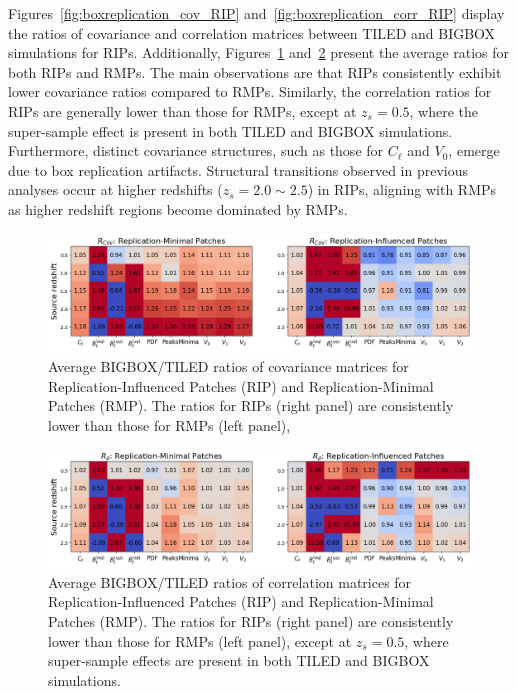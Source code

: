 Figures~\ref{fig:boxreplication_cov_RIP} and~\ref{fig:boxreplication_corr_RIP} display the ratios of covariance and correlation matrices between TILED and BIGBOX simulations for RIPs. Additionally, Figures~\ref{fig:boxreplication_avg_cov} and~\ref{fig:boxreplication_avg_corr} present the average ratios for both RIPs and RMPs. The main observations are that RIPs consistently exhibit lower covariance ratios compared to RMPs. Similarly, the correlation ratios for RIPs are generally lower than those for RMPs, except at $z_s=0.5$, where the super-sample effect is present in both TILED and BIGBOX simulations. Furthermore, distinct covariance structures, such as those for $C_\ell$ and $V_0$, emerge due to box replication artifacts. Structural transitions observed in previous analyses occur at higher redshifts ($z_s=2.0\sim2.5$) in RIPs, aligning with RMPs as higher redshift regions become dominated by RMPs.

\begin{figure}[ht]
    \centering
    \includegraphics[width=\textwidth]{figures/results/BR_avg_cov_ratio.png}
    \caption[Average BIGBOX / TILED ratios of covariance matrices for the RIPs and the RMPs]{Average BIGBOX/TILED ratios of covariance matrices for Replication-Influenced Patches (RIP) and Replication-Minimal Patches (RMP). The ratios for RIPs (right panel) are consistently lower than those for RMPs (left panel), }
    \label{fig:boxreplication_avg_cov}
\end{figure}

\begin{figure}[ht]
    \includegraphics[width=\textwidth]{figures/results/BR_avg_corr_ratio.png}
    \caption[Average BIGBOX / TILED ratios of correlation matrices for the RIPs and the RMPs]{Average BIGBOX/TILED ratios of correlation matrices for Replication-Influenced Patches (RIP) and Replication-Minimal Patches (RMP). The ratios for RIPs (right panel) are consistently lower than those for RMPs (left panel), except at $z_s = 0.5$, where super-sample effects are present in both TILED and BIGBOX simulations.}
    \label{fig:boxreplication_avg_corr}
\end{figure}

